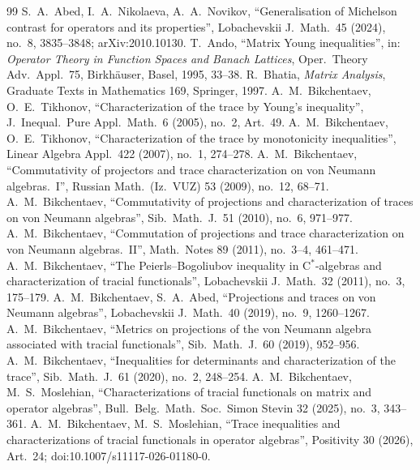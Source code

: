 \documentclass[11pt]{article}
\theoremstyle{plain}
\theoremstyle{definition}
\theoremstyle{remark}
\begin{document}
{\sloppy
\begin{thebibliography}{99}
 S.~A.~Abed, I.~A.~Nikolaeva, A.~A.~Novikov, ``Generalisation of Michelson contrast for
  operators and its properties'', Lobachevskii J.\ Math.\ 45 (2024), no.~8, 3835--3848; arXiv:2010.10130.
 T.~Ando, ``Matrix Young inequalities'', in: \emph{Operator Theory in Function Spaces and Banach
  Lattices}, Oper.\ Theory Adv.\ Appl.\ 75, Birkh\"auser, Basel, 1995, 33--38.
 R.~Bhatia, \emph{Matrix Analysis}, Graduate Texts in Mathematics 169, Springer, 1997.
 A.~M.~Bikchentaev, O.~E.~Tikhonov, ``Characterization of the trace by Young's
  inequality'', J.\ Inequal.\ Pure Appl.\ Math.\ 6 (2005), no.~2, Art.~49.
 A.~M.~Bikchentaev, O.~E.~Tikhonov, ``Characterization of the trace by monotonicity
  inequalities'', Linear Algebra Appl.\ 422 (2007), no.~1, 274--278.
 A.~M.~Bikchentaev, ``Commutativity of projectors and trace characterization on von Neumann
  algebras.~I'', Russian Math.\ (Iz.\ VUZ) 53 (2009), no.~12, 68--71.
 A.~M.~Bikchentaev, ``Commutativity of projections and characterization of traces on von
  Neumann algebras'', Sib.\ Math.\ J.\ 51 (2010), no.~6, 971--977.
 A.~M.~Bikchentaev, ``Commutation of projections and trace characterization on von
  Neumann algebras.~II'', Math.\ Notes 89 (2011), no.~3--4, 461--471.
 A.~M.~Bikchentaev, ``The Peierls--Bogoliubov inequality in C$^*$-algebras and
  characterization of tracial functionals'', Lobachevskii J.\ Math.\ 32 (2011), no.~3, 175--179.
 A.~M.~Bikchentaev, S.~A.~Abed, ``Projections and traces on von Neumann algebras'',
  Lobachevskii J.\ Math.\ 40 (2019), no.~9, 1260--1267.
 A.~M.~Bikchentaev, ``Metrics on projections of the von Neumann algebra associated
  with tracial functionals'', Sib.\ Math.\ J.\ 60 (2019), 952--956.
 A.~M.~Bikchentaev, ``Inequalities for determinants and characterization of the
  trace'', Sib.\ Math.\ J.\ 61 (2020), no.~2, 248--254.
 A.~M.~Bikchentaev, M.~S.~Moslehian, ``Characterizations of tracial functionals on
  matrix and operator algebras'', Bull.\ Belg.\ Math.\ Soc.\ Simon Stevin 32 (2025), no.~3, 343--361.
 A.~M.~Bikchentaev, M.~S.~Moslehian, ``Trace inequalities and characterizations
  of tracial functionals in operator algebras'', Positivity 30 (2026), Art.~24; doi:10.1007/s11117-026-01180-0.

\end{thebibliography}}
\end{document}
